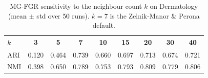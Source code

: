 \begin{table}[!htbp]
\footnotesize
  \centering
  \caption{MG-FGR sensitivity to the neighbour count $k$ on Dermatology (mean $\pm$ std over 50 runs). $k=7$ is the Zelnik-Manor \& Perona default.}
  \label{tab:k_sensitivity}
  \begin{tabular}{lcccccccc}
    \toprule
    $k$ & 3 & 5 & \textbf{7} & 10 & 15 & 20 & 30 & 40 \\
    \midrule
    ARI & 0.120 & 0.464 & 0.739 & 0.660 & 0.697 & 0.713 & 0.674 & 0.721 \\
    NMI & 0.398 & 0.650 & 0.789 & 0.753 & 0.793 & 0.809 & 0.779 & 0.806 \\
    \bottomrule
  \end{tabular}
\end{table}